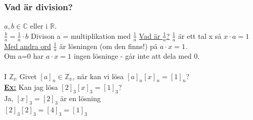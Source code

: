 \documentclass{article}
\begin{document}
    \subsubsection{Vad är division?}
    $a,b\in \mathbb{C}$ eller i $\mathbb{R}$.\\
    $\frac{b}{a}=\frac{1}{a}\cdot b$ Divison a = multiplikation med $\frac{1}{a}$
    \underline{Vad är $\frac{1}{a}$?} $\frac{1}{a}$ är ett tal x så $x\cdot a=1$\\
    \underline{Med andra ord} $\frac{1}{a}$ är lösningen (om den finns!) på $a\cdot x=1$.\\
    Om a=0 har $a\cdot x=1$ ingen lösninge - går inte att dela med $0$.\\\\
    I $\mathbb{Z_{n}}$ Givet $[a]_{n}\in \mathbb{{Z}_{n}}$, när kan vi lösa $[a]_{n}[x]_{n}=[1]_{n}$?\\
    \underline{\textbf{Ex:}} Kan jag lösa $[2]_{3}[x]_{3}=[1]_{3}$?\\
    Ja, $[x]_{3}=[2]_{3}$ är en lösning\\
    $[2]_{3}[2]_{3}=[4]_{3}=[1]_{3}$
\end{document}
